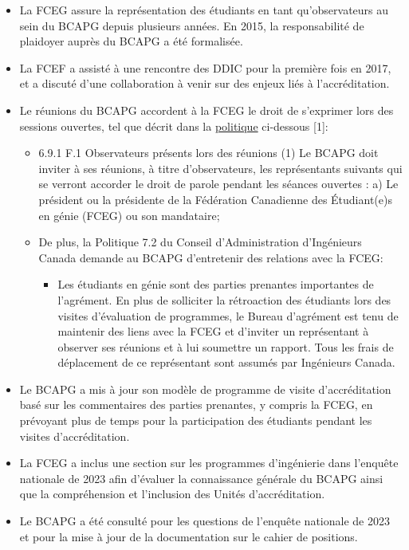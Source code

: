 \begin{itemize}
 \item La FCEG assure la représentation des étudiants en tant qu'observateurs au sein du BCAPG depuis plusieurs années. En 2015, la responsabilité de plaidoyer auprès du BCAPG a été formalisée.
 \item La FCEF a assisté à une rencontre des DDIC pour la première fois en 2017, et a discuté d'une collaboration à venir sur des enjeux liés à l'accréditation.
 \item Le réunions du BCAPG accordent à la FCEG le droit de s'exprimer lors des sessions ouvertes, tel que décrit dans la \href{https://engineerscanada.ca/sites/default/files/2022-02/Board-Policy-Manual-Combined-e.pdf}{politique} ci-dessous [1]:
 \begin{itemize}
  \item 6.9.1 F.1 Observateurs présents lors des réunions (1) Le BCAPG doit inviter à ses réunions, à titre d'observateurs, les représentants suivants qui se verront accorder le droit de parole pendant les séances ouvertes : a) Le président ou la présidente de la Fédération Canadienne des Étudiant(e)s en génie (FCEG) ou son mandataire;
  \item De plus, la Politique 7.2 du Conseil d'Administration d'Ingénieurs Canada demande au BCAPG d'entretenir des relations avec la FCEG:
  \begin{itemize}
   \item Les étudiants en génie sont des parties prenantes importantes de l'agrément. En plus de solliciter la rétroaction des étudiants lors des visites d'évaluation de programmes, le Bureau d'agrément est tenu de maintenir des liens avec la FCEG et d'inviter un représentant à observer ses réunions et à lui soumettre un rapport. Tous les frais de déplacement de ce représentant sont assumés par Ingénieurs Canada.
  \end{itemize}
 \end{itemize}
 \item Le BCAPG a mis à jour son modèle de programme de visite d'accréditation basé sur les commentaires des parties prenantes, y compris la FCEG, en prévoyant plus de temps pour la participation des étudiants pendant les visites d'accréditation.
 \item La FCEG a inclus une section sur les programmes d'ingénierie dans l'enquête nationale de 2023 afin d'évaluer la connaissance générale du BCAPG ainsi que la compréhension et l'inclusion des Unités d'accréditation.
 \item Le BCAPG a été consulté pour les questions de l'enquête nationale de 2023 et pour la mise à jour de la documentation sur le cahier de positions.
\end{itemize}

